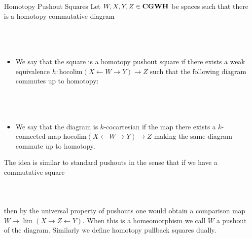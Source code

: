 \documentclass[a4paper]{article}
\begin{document}
\begin{defn}{Homotopy Pushout Squares}{} Let $W,X,Y,Z\in\bold{CGWH}$ be spaces such that there is a homotopy commutative diagram \\~\\
\\~\\
\begin{itemize}
\item We say that the square is a homotopy pushout square if there exists a weak equivalence $h:\text{hocolim}(X\leftarrow W\rightarrow Y)\to Z$ such that the following diagram commutes up to homotopy: \\~\\
\\~\\
\item We say that the diagram is $k$-cocartesian if the map there exists a $k$-connected map $\text{hocolim}(X\leftarrow W\rightarrow Y)\to Z$ making the same diagram commute up to homotopy. 
\end{itemize}
\end{defn}

The idea is similar to standard pushouts in the sense that if we have a commutative square \\~\\
\\~\\
then by the universal property of pushouts one would obtain a comparison map $W\to\lim(X\rightarrow Z\leftarrow Y)$. When this is a homeomorphism we call $W$ a pushout of the diagram. Similarly we define homotopy pullback squares dually. \\~\\
\end{document}
